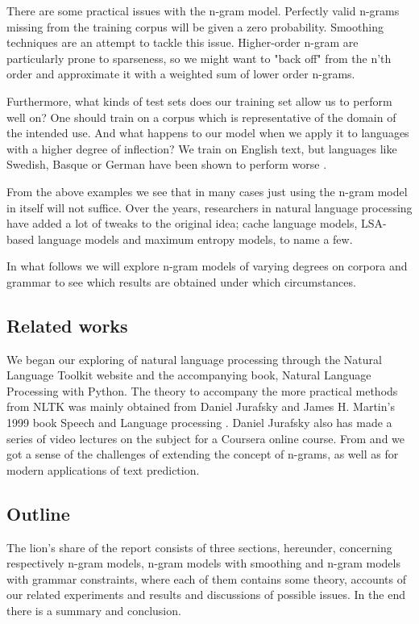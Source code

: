 \documentclass[a4paper,12pt]{article}
\begin{document}
There are some practical issues with the n-gram model. Perfectly valid n-grams missing from the training corpus will be given a zero probability. Smoothing techniques are an attempt to tackle this issue. Higher-order n-gram are particularly prone to sparseness, so we might want to "back off" from the n'th order and approximate it with a weighted sum of lower order n-grams. 

Furthermore, what kinds of test sets does our training set allow us to perform well on? One should train on a  corpus which is representative of the domain of the intended use. And what happens to our model when we apply it to languages with a higher degree of inflection? We train on English text, but languages like Swedish, Basque or German have been shown to perform worse \cite{garay2006text} .

From the above examples we see that in many cases just using the n-gram model in itself will not suffice. Over the years, researchers in natural language processing have added a lot of tweaks to the original idea; cache language models, LSA-based language models and maximum entropy models, to name a few.

In what follows we will explore n-gram models of varying degrees on corpora and grammar to see which results are obtained under which circumstances.

\subsection{Related works}
We began our exploring of natural language processing through the Natural Language Toolkit website and the accompanying book, Natural Language Processing with Python. The theory to accompany the more practical methods from NLTK was mainly obtained from Daniel Jurafsky and James H. Martin's 1999 book Speech and Language processing \cite{JurafskyBook}. Daniel Jurafsky also has made a series of video lectures on the subject for a Coursera online course. From \cite{brown1992class} and \cite{garay2006text} we got a sense of the challenges of extending the concept of n-grams, as well as for modern applications of text prediction.

\subsection{Outline}
The lion's share of the report consists of three sections, hereunder, concerning respectively n-gram models, n-gram models with smoothing and n-gram models with grammar constraints, where each of them contains some theory, accounts of our related experiments and results and discussions of possible issues. In the end there is a summary and conclusion.
\end{document}
